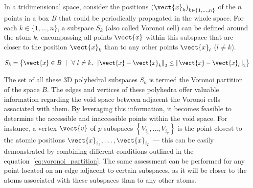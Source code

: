 \documentclass[main]{subfiles}
\begin{document}
In a tridimensional space, consider the positions ${(\vect{x}_k)}_{k\in\{1,\ldots,n\}}$ of the $n$ points in a box $B$ that could be periodically propagated in the whole space. For each $k\in\{1,\ldots,n\}$, a subspace $S_{k}$ (also called Voronoi cell) can be defined around the atom $k$, encompassing all points $\vect{x}$ within this subspace that are closer to the position $\vect{x}_k$ than to any other points $\vect{x}_l$ ($l\neq k$). 

\begin{equation}\label{eq:voronoi_partition}
  S_{k} = \left\{\vect{x} \in B\ \ |\ \ \forall\ l\neq k,\ {\lVert \vect{x}-\vect{x}_k \rVert}_2 \leq {\lVert \vect{x}-\vect{x}_l \rVert}_2 \right\}
\end{equation}

The set of all these 3D polyhedral subspaces $S_{k}$ is termed the Voronoi partition of the space $B$. The edges and vertices of these polyhedra offer valuable information regarding the void space between adjacent the Voronoi cells associated with them. By leveraging this information, it becomes feasible to determine the accessible and inaccessible points within the void space. For instance, a vertex $\vect{v}$ of $p$ subspaces $\left\{V_{i_1},\ldots,V_{i_p}\right\}$ is the point closest to the atomic positions $\vect{x}_{i_1},\ldots,\vect{x}_{i_p}$ --- this can be easily demonstrated by combining different conditions outlined in the equation~\ref{eq:voronoi_partition}. The same assessment can be performed for any point located on an edge adjacent to certain subspaces, as it will be closer to the atoms associated with these subspaces than to any other atoms. 
\end{document}
